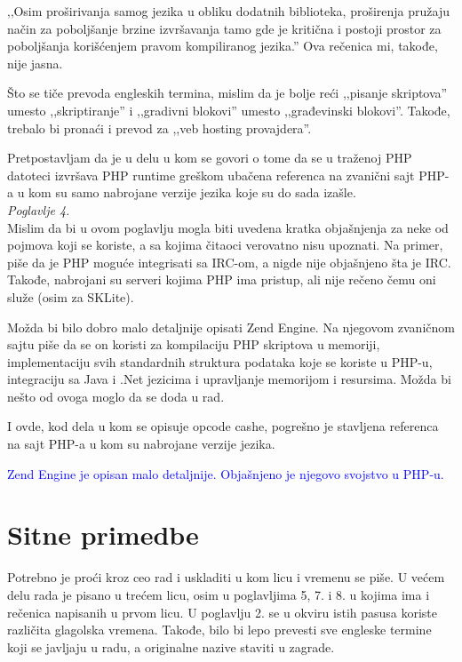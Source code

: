 \documentclass[a4paper]{report}
\newcommand{\odgovor}[1]{\textcolor{blue}{#1}}
\begin{document}
‚‚Osim proširivanja samog jezika u obliku dodatnih biblioteka, proširenja pružaju način za poboljšanje brzine izvršavanja tamo gde je kritična i postoji prostor za poboljšanja korišćenjem pravom kompiliranog jezika.'' Ova rečenica mi, takođe, nije jasna.

Što se tiče prevoda engleskih termina, mislim da je bolje reći ,,pisanje skriptova'' umesto ,,skriptiranje'' i ,,gradivni blokovi'' umesto ,,građevinski blokovi''. Takođe, trebalo bi pronaći i prevod za ,,veb hosting provajdera''.

Pretpostavljam da je u delu u kom se govori o tome da se u traženoj PHP datoteci izvršava PHP runtime greškom ubačena referenca na zvanični sajt PHP-a u kom su samo nabrojane verzije jezika koje su do sada izašle.\\


\textit{Poglavlje 4.}\\

Mislim da bi u ovom poglavlju mogla biti uvedena kratka objašnjenja za neke od pojmova koji se koriste, a sa kojima čitaoci verovatno nisu upoznati. Na primer, piše da je PHP moguće integrisati sa IRC-om, a nigde nije objašnjeno šta je IRC. Takođe, nabrojani su serveri kojima PHP ima pristup, ali nije rečeno čemu oni služe (osim za SKLite).

Možda bi bilo dobro malo detaljnije opisati Zend Engine. Na njegovom zvaničnom sajtu piše da se on koristi za kompilaciju PHP skriptova u memoriji, implementaciju svih standardnih struktura podataka koje se koriste u PHP-u, integraciju sa Java i .Net jezicima i upravljanje memorijom i resursima. Možda bi nešto od ovoga moglo da se doda u rad.

I ovde, kod dela u kom se opisuje opcode cashe, pogrešno je stavljena referenca na sajt PHP-a u kom su nabrojane verzije jezika.

\odgovor{Zend Engine je opisan malo detaljnije. Objašnjeno je njegovo svojstvo u PHP-u.}

\section{Sitne primedbe}

Potrebno je proći kroz ceo rad i uskladiti u kom licu i vremenu se piše. U većem delu rada je pisano u trećem licu, osim u poglavljima 5, 7. i 8. u kojima ima i rečenica napisanih u prvom licu. U poglavlju 2. se u okviru istih pasusa koriste različita glagolska vremena. Takođe, bilo bi lepo prevesti sve engleske termine koji se javljaju u radu, a originalne nazive staviti u zagrade.
\end{document}
